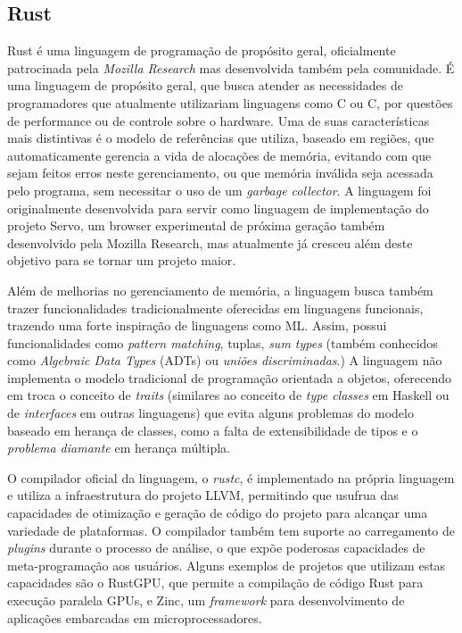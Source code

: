 \documentclass[12pt]{article}
\def\Cpp{{C\nolinebreak[4]\raisebox{.20ex}{\small\bf++}}}
\begin{document}
\subsection{Rust}

Rust\citep{rust} é uma linguagem de programação de propósito geral, oficialmente patrocinada pela
\emph{Mozilla Research} mas desenvolvida também pela comunidade. É uma linguagem de propósito geral,
que busca atender as necessidades de programadores que atualmente utilizariam linguagens como C ou
\Cpp, por questões de performance ou de controle sobre o hardware. Uma de suas características mais
distintivas é o modelo de referências que utiliza, baseado em regiões\citep{tofte1997}, que
automaticamente gerencia a vida de alocações de memória, evitando com que sejam feitos erros neste
gerenciamento, ou que memória inválida seja acessada pelo programa, sem necessitar o uso de um
\emph{garbage collector}. A linguagem foi originalmente desenvolvida para servir como linguagem de
implementação do projeto Servo\citep{servo}, um browser experimental de próxima geração também
desenvolvido pela Mozilla Research, mas atualmente já cresceu além deste objetivo para se tornar um
projeto maior.

Além de melhorias no gerenciamento de memória, a linguagem busca também trazer funcionalidades
tradicionalmente oferecidas em linguagens funcionais, trazendo uma forte inspiração de linguagens
como ML\citep{milner1997}. Assim, possui funcionalidades como \emph{pattern matching}, tuplas,
\emph{sum types} (também conhecidos como \emph{Algebraic Data Types} (ADTs) ou \emph{uniões
discriminadas}.) A linguagem não implementa o modelo tradicional de programação orientada a objetos,
oferecendo em troca o conceito de \emph{traits} (similares ao conceito de \emph{type classes} em
Haskell ou de \emph{interfaces} em outras linguagens) que evita alguns problemas do modelo baseado
em herança de classes, como a falta de extensibilidade de tipos e o \emph{problema diamante} em
herança múltipla\citep{scharli2003}.

O compilador oficial da linguagem, o \emph{rustc}, é implementado na própria linguagem e utiliza a
infraestrutura do projeto LLVM\citep{lattner2004}, permitindo que usufrua das capacidades de
otimização e geração de código do projeto para alcançar uma variedade de plataformas. O compilador
também tem suporte ao carregamento de \emph{plugins} durante o processo de análise, o que expõe
poderosas capacidades de meta-programação aos usuários. Alguns exemplos de projetos que utilizam
estas capacidades são o RustGPU\citep{holk2013}, que permite a compilação de código Rust para
execução paralela GPUs, e Zinc\citep{zinc}, um \emph{framework} para desenvolvimento de aplicações
embarcadas em microprocessadores.
\end{document}
